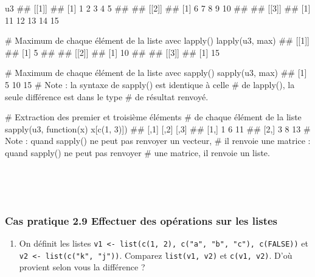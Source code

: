 \documentclass[12pt,twosided, notitlepage]{book}
\newenvironment{Shaded}{}{}
\newcommand{\KeywordTok}[1]{\textcolor[rgb]{0.00,0.00,1.00}{#1}}
\newcommand{\DecValTok}[1]{#1}
\newcommand{\CommentTok}[1]{\textcolor[rgb]{0.00,0.50,0.00}{#1}}
\newcommand{\ControlFlowTok}[1]{\textcolor[rgb]{0.00,0.00,1.00}{#1}}
\newcommand{\NormalTok}[1]{#1}
\providecommand{\tightlist}{%
  \setlength{\itemsep}{0pt}\setlength{\parskip}{0pt}}
\renewenvironment{Shaded}{\begin{snugshade}}{\end{snugshade}}
\begin{document}
\begin{Shaded}
\begin{Highlighting}[]
\NormalTok{u3}
\NormalTok{  ## [[1]]}
\NormalTok{  ## [1] 1 2 3 4 5}
\NormalTok{  ## }
\NormalTok{  ## [[2]]}
\NormalTok{  ## [1]  6  7  8  9 10}
\NormalTok{  ## }
\NormalTok{  ## [[3]]}
\NormalTok{  ## [1] 11 12 13 14 15}

\CommentTok{# Maximum de chaque élément de la liste avec lapply()}
\KeywordTok{lapply}\NormalTok{(u3, max)}
\NormalTok{  ## [[1]]}
\NormalTok{  ## [1] 5}
\NormalTok{  ## }
\NormalTok{  ## [[2]]}
\NormalTok{  ## [1] 10}
\NormalTok{  ## }
\NormalTok{  ## [[3]]}
\NormalTok{  ## [1] 15}

\CommentTok{# Maximum de chaque élément de la liste avec sapply()}
\KeywordTok{sapply}\NormalTok{(u3, max)}
\NormalTok{  ## [1]  5 10 15}
\CommentTok{# Note : la syntaxe de sapply() est identique à celle}
\CommentTok{# de lapply(), la seule différence est dans le type}
\CommentTok{# de résultat renvoyé.}

\CommentTok{# Extraction des premier et troisième éléments }
\CommentTok{# de chaque élément de la liste}
\KeywordTok{sapply}\NormalTok{(u3, }\ControlFlowTok{function}\NormalTok{(x) x[}\KeywordTok{c}\NormalTok{(}\DecValTok{1}\NormalTok{, }\DecValTok{3}\NormalTok{)])}
\NormalTok{  ##      [,1] [,2] [,3]}
\NormalTok{  ## [1,]    1    6   11}
\NormalTok{  ## [2,]    3    8   13}
\CommentTok{# Note : quand sapply() ne peut pas renvoyer un vecteur, }
\CommentTok{# il renvoie une matrice : quand sapply() ne peut pas renvoyer}
\CommentTok{# une matrice, il renvoie un liste. }
\end{Highlighting}
\end{Shaded}

~

~

\subsubsection{\texorpdfstring{\textbf{Cas pratique 2.9} Effectuer des
opérations sur les
listes}{Cas pratique 2.9 Effectuer des opérations sur les listes}}\label{cas-pratique-2.9-effectuer-des-operations-sur-les-listes}


\begin{enumerate}
\def\labelenumi{\alph{enumi}.}
\tightlist
\item
  On définit les listes
  \texttt{v1\ \textless{}-\ list(c(1,\ 2),\ c("a",\ "b",\ "c"),\ c(FALSE))}
  et \texttt{v2\ \textless{}-\ list(c("k",\ "j"))}. Comparez
  \texttt{list(v1,\ v2)} et \texttt{c(v1,\ v2)}. D'où provient selon
  vous la différence ?
\end{enumerate}
\end{document}
